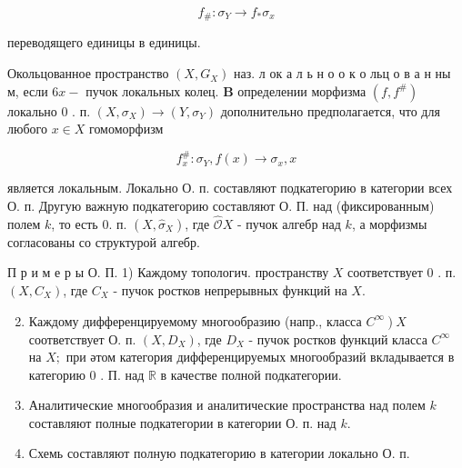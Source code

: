 \documentclass[10pt]{article}
\begin{document}
\[

f_{\#}: \sigma_{Y} \longrightarrow f_{*} \sigma_{x}

\]



переводящего единицы в единицы.



Окольцованное пространство $\left(X, G_{X}\right)$ наз. л ок а л ь н о о к о льц о в а н ны м, если $6 x-$ пучок локальных колец. $\mathbf{B}$ определении морфизма $\left(f, f^{\#}\right)$ локально 0 . п. $\left(X, \sigma_{X}\right) \rightarrow\left(Y, \sigma_{Y}\right)$ дополнительно предполагается, что для любого $x \in X$ гомоморфизм



\[

f_{x}^{\#}: \sigma_{Y}, f(x) \longrightarrow \sigma_{x}, x

\]



является локальным. Локально О. п. составляют подкатегорию в категории всех О. п. Другую важную подкатегорию составляют О. П. над (фиксированным) полем $k$, то есть 0. п. $\left(X, \hat{\sigma}_{X}\right)$, где $\hat{\mathcal{O}} X$ - пучок алгебр над $k$, а морфизмы согласованы со структурой алгебр.



П р и м е р ы О. П. 1) Каждому топологич. пространству $X$ соответствует 0 . п. $\left(X, C_{X}\right)$, где $C_{X}$ - пучок ростков непрерывных функций на $X$.



\begin{enumerate}

  \setcounter{enumi}{1}

  \item Каждому дифференцируемому многообразию (напр., класса $\left.C^{\infty}\right) X$ соответствует О. п. $\left(X, D_{X}\right)$, где $D_{X}$ - пучок ростков функций класса $C^{\infty}$ на $X ;$ при әтом категория дифференцируемых многообразий вкладывается в категорию 0 . П. над $\mathbb{R}$ в качестве полной подкатегории.



  \item Аналитические многообразия и аналитические пространства над полем $k$ составляют полные подкатегории в категории О. п. над $k$.



  \item Схемь составляют полную подкатегорию в категории локально О. п.



\end{enumerate}
\end{document}
